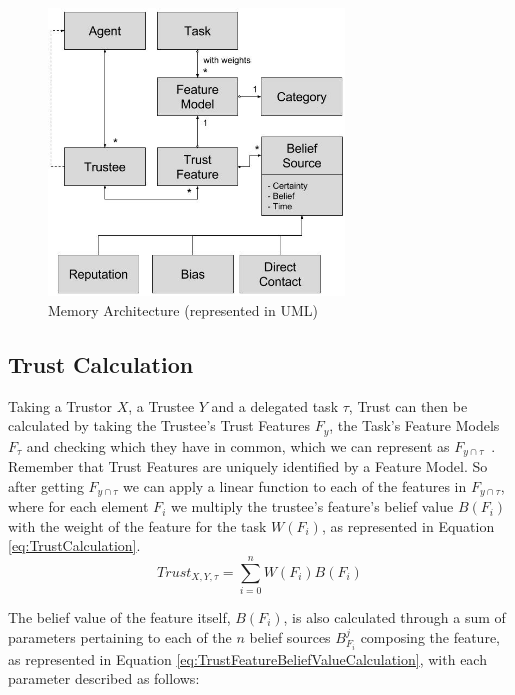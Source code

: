 \begin{figure}[hbt]
    \centering
    \includegraphics[width=0.7\textwidth]{figures/TrustMemoryDiagram.jpg}
    \caption{Memory Architecture (represented in UML)}
    \label{fig:MemoryArchitecture}
\end{figure}


\subsection{Trust Calculation}
\label{subsec:TrustCalculation}
Taking a Trustor $X$, a Trustee $Y$ and a delegated task $\tau$, Trust can then be calculated by taking the Trustee's Trust Features $F_y$, the Task's Feature Models $F_\tau$ and checking which they have in common, which we can represent as $F_{y\cap\tau}$~. Remember that Trust Features are uniquely identified by a Feature Model. So after getting $F_{y\cap\tau}$ we can apply a linear function to each of the features in $F_{y\cap\tau}$, where for each element $F_i$ we multiply the trustee's feature's belief value $B(F_i)$ with the weight of the feature for the task $W(F_i)$, as represented in Equation \ref{eq:TrustCalculation}.
\begin{equation}
Trust_{X,Y,\tau}=\sum_{i=0}^{n}W(F_i) B(F_i)
\label{eq:TrustCalculation}
\end{equation}

The belief value of the feature itself, $B(F_i)$, is also calculated through a sum of parameters pertaining to each of the $n$ belief sources $B_{F_i}^j$ composing the feature, as represented in Equation \ref{eq:TrustFeatureBeliefValueCalculation}, with each parameter described as follows: 

